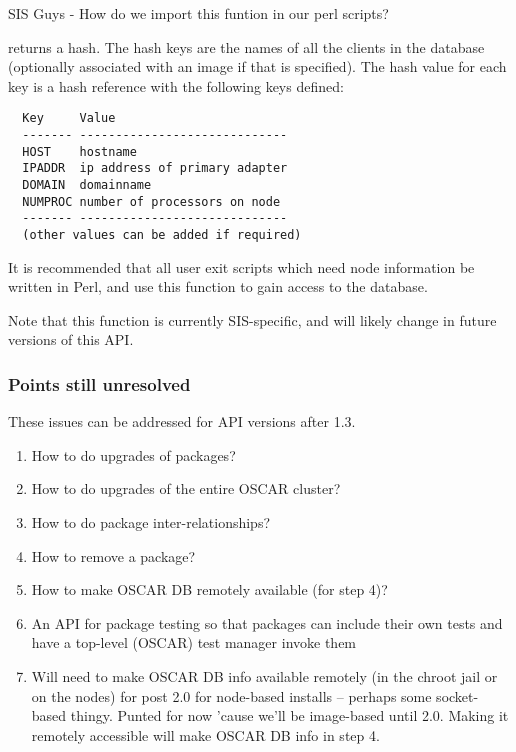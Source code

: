 \begin{discuss}
SIS Guys - How do we import this funtion in our perl scripts?
\end{discuss}

 returns a hash.  The hash keys are the
names of all the clients in the database (optionally associated with
an image if that is specified).  The hash value for each key is a hash
reference with the following keys defined:

\begin{verbatim}
  Key     Value
  ------- -----------------------------
  HOST    hostname
  IPADDR  ip address of primary adapter
  DOMAIN  domainname
  NUMPROC number of processors on node
  ------- -----------------------------
  (other values can be added if required)
\end{verbatim}

It is recommended that all user exit scripts which need node
information be written in Perl, and use this function to gain access
to the database.

Note that this function is currently SIS-specific, and will likely
change in future versions of this API.


\subsubsection{Points still unresolved}

These issues can be addressed for API versions after 1.3.

\begin{enumerate}
\item How to do upgrades of packages?
\item How to do upgrades of the entire OSCAR cluster?
\item How to do package inter-relationships?
\item How to remove a package?
\item How to make OSCAR DB remotely available (for step 4)?
\item An API for package testing so that packages can include their
  own tests and have a top-level (OSCAR) test manager invoke them
  
\item Will need to make OSCAR DB info available remotely (in the
  chroot jail or on the nodes) for post 2.0 for node-based installs --
  perhaps some socket-based thingy.  Punted for now 'cause we'll be
  image-based until 2.0.  Making it remotely accessible will make
  OSCAR DB info in step 4.
\end{enumerate}

